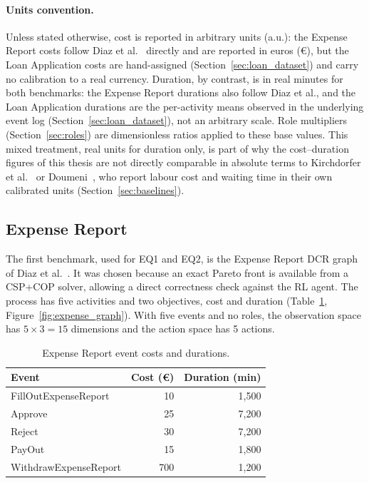 \paragraph{Units convention.} Unless stated otherwise, cost is reported
in arbitrary units (a.u.): the Expense Report costs follow Diaz et
al.~\cite{Diaz2024Pareto-OptimalModels} directly and are reported in
euros (€), but the Loan Application costs are hand-assigned
(Section~\ref{sec:loan_dataset}) and carry no calibration to a real
currency. Duration, by contrast, is in real minutes for both
benchmarks: the Expense Report durations also follow Diaz et al.,
and the Loan Application durations are the per-activity means
observed in the underlying event log (Section~\ref{sec:loan_dataset}),
not an arbitrary scale. Role multipliers (Section~\ref{sec:roles}) are
dimensionless ratios applied to these base values. This mixed
treatment, real units for duration only, is part of why the
cost--duration figures of this thesis are not directly comparable in
absolute terms to Kirchdorfer et al.~\cite{KirchdorferLukasFromPolicies}
or Doumeni~\cite{ArtemisDoumeniParetoAgentSimulator}, who report
labour cost and waiting time in their own calibrated units
(Section~\ref{sec:baselines}).


\subsection{Expense Report}
\label{sec:expense_dataset}

The first benchmark, used for EQ1 and EQ2, is the Expense Report
\ac{DCR} graph of Diaz et
al.~\cite{Diaz2024Pareto-OptimalModels}. It was chosen because an exact
Pareto front is available from a CSP+COP solver, allowing a direct
correctness check against the \ac{RL} agent. The process has five
activities and two objectives, cost and duration
(Table~\ref{tab:expense_costs}, Figure~\ref{fig:expense_graph}). With
five events and no roles, the observation space has $5 \times 3 = 15$
dimensions and the action space has 5 actions.

\begin{table}[H]
\centering
\renewcommand{\arraystretch}{1.5}
\setlength{\tabcolsep}{14pt}
\caption{Expense Report event costs and durations.}
\label{tab:expense_costs}
\begin{tabular}{lrr}
\toprule
\textbf{Event} & \textbf{Cost (€)} & \textbf{Duration (min)} \\
\midrule
FillOutExpenseReport  & 10  & 1{,}500 \\
Approve               & 25  & 7{,}200 \\
Reject                & 30  & 7{,}200 \\
PayOut                & 15  & 1{,}800 \\
WithdrawExpenseReport & 700 & 1{,}200 \\
\bottomrule
\end{tabular}
\end{table}

